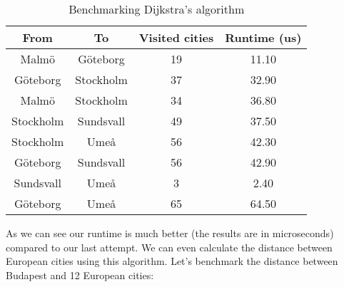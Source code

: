 \documentclass[a4paper,11pt]{article}
\begin{document}
    \begin{table}[H]
        \begin{center}
            \begin{tabular}{c|c|c|c}
                \textbf{From} & \textbf{To} & \textbf{Visited cities} & \textbf{Runtime (us)}\\
                \hline
                Malmö  &   Göteborg     &  19 &     11.10\\
                Göteborg &    Stockholm    &  37 &     32.90\\
                Malmö &    Stockholm    &  34 &     36.80\\
                Stockholm &    Sundsvall    &  49 &     37.50\\
                Stockholm &    Umeå    &  56 &     42.30\\
                Göteborg &    Sundsvall    &  56 &     42.90\\
                Sundsvall &    Umeå    &  3 &     2.40\\
                Göteborg &    Umeå    &  65 &     64.50\\
            \end{tabular}
            \caption{Benchmarking Dijkstra's algorithm}
            \label{tab:table1}
        \end{center}
    \end{table}

    As we can see our runtime is much better (the results are in microseconds) compared to our last attempt.
    We can even calculate the distance between European cities using this algorithm.
    Let's benchmark the distance between Budapest and 12 European cities:
\end{document}
